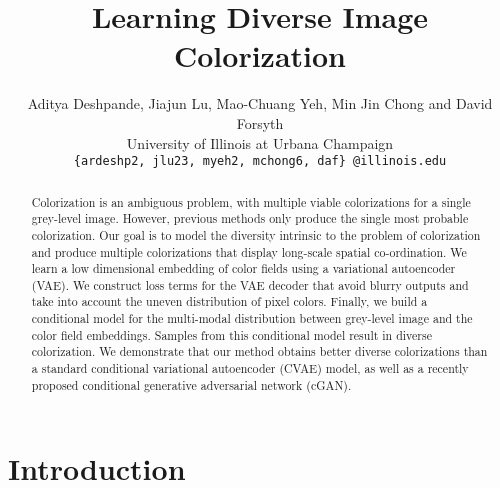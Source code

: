 \documentclass[10pt,twocolumn,letterpaper]{article}
\begin{document}
\title{Learning Diverse Image Colorization}

\author{
Aditya Deshpande, Jiajun Lu, Mao-Chuang Yeh, Min Jin Chong and David Forsyth\\
University of Illinois at Urbana Champaign\\
{\tt\small \{ardeshp2, jlu23, myeh2, mchong6, daf\} @illinois.edu}
}

\maketitle

\begin{abstract}
Colorization is an ambiguous problem, with multiple viable colorizations for a single grey-level
image. However, previous methods only produce the single most probable colorization. Our goal
is to model the diversity intrinsic to the problem of colorization and produce multiple colorizations
that display long-scale spatial co-ordination. We learn a low dimensional embedding of 
color fields using a variational autoencoder (VAE). We construct loss terms for the VAE decoder that avoid
blurry outputs and take into account the uneven distribution of pixel colors. Finally, we build
a conditional model for the multi-modal distribution between grey-level image and the
color field embeddings. Samples from this conditional model result in diverse colorization.
We demonstrate that our method obtains better diverse colorizations than a standard 
conditional variational autoencoder (CVAE) model, as well as a recently proposed conditional 
generative adversarial network (cGAN).
\end{abstract}


\section{Introduction}\label{sec:intro}
\end{document}

